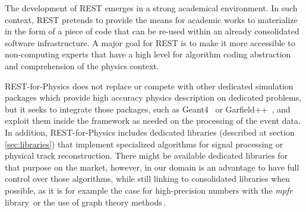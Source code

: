 The development of REST emerges in a strong academical environment. In such context, REST pretends to provide the means for academic works to materialize in the form of a piece of code that can be re-used within an already consolidated software infrastructure. A major goal for REST is to make it more accessible to non-computing experts that have a high level for algorithm coding abstraction and comprehension of the physics context.

REST-for-Physics does not replace or compete with other dedicated simulation packages which provide high accuracy physics description on dedicated problems, but it seeks to integrate those packages, such as Geant4~\cite{Agostinelli:2002hh} or Garfield++~\cite{Garfield}, and exploit them inside the framework as needed on the processing of the event data. In addition, REST-for-Physics includes dedicated libraries (described at section\,\ref{sec:libraries}) that implement specialized algorithms for signal processing or physical track reconstruction. There might be available dedicated libraries for that purpose on the market, however, in our domain is an advantage to have full control over those algorithms, while still linking to consolidated libraries when possible, as it is for example the case for high-precision numbers with the \emph{mpfr} library\,\cite{10.1145/1236463.1236468} or the use of graph theory methods\,\cite{Applegate:2007:TSP:1374811,concorde}.





